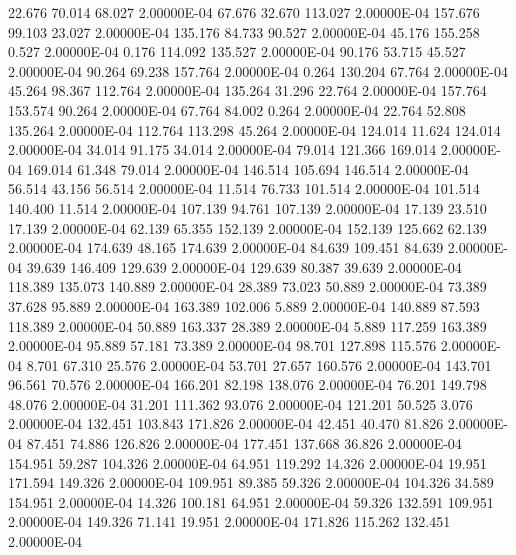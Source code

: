     22.676    70.014    68.027  2.00000E-04
    67.676    32.670   113.027  2.00000E-04
   157.676    99.103    23.027  2.00000E-04
   135.176    84.733    90.527  2.00000E-04
    45.176   155.258     0.527  2.00000E-04
     0.176   114.092   135.527  2.00000E-04
    90.176    53.715    45.527  2.00000E-04
    90.264    69.238   157.764  2.00000E-04
     0.264   130.204    67.764  2.00000E-04
    45.264    98.367   112.764  2.00000E-04
   135.264    31.296    22.764  2.00000E-04
   157.764   153.574    90.264  2.00000E-04
    67.764    84.002     0.264  2.00000E-04
    22.764    52.808   135.264  2.00000E-04
   112.764   113.298    45.264  2.00000E-04
   124.014    11.624   124.014  2.00000E-04
    34.014    91.175    34.014  2.00000E-04
    79.014   121.366   169.014  2.00000E-04
   169.014    61.348    79.014  2.00000E-04
   146.514   105.694   146.514  2.00000E-04
    56.514    43.156    56.514  2.00000E-04
    11.514    76.733   101.514  2.00000E-04
   101.514   140.400    11.514  2.00000E-04
   107.139    94.761   107.139  2.00000E-04
    17.139    23.510    17.139  2.00000E-04
    62.139    65.355   152.139  2.00000E-04
   152.139   125.662    62.139  2.00000E-04
   174.639    48.165   174.639  2.00000E-04
    84.639   109.451    84.639  2.00000E-04
    39.639   146.409   129.639  2.00000E-04
   129.639    80.387    39.639  2.00000E-04
   118.389   135.073   140.889  2.00000E-04
    28.389    73.023    50.889  2.00000E-04
    73.389    37.628    95.889  2.00000E-04
   163.389   102.006     5.889  2.00000E-04
   140.889    87.593   118.389  2.00000E-04
    50.889   163.337    28.389  2.00000E-04
     5.889   117.259   163.389  2.00000E-04
    95.889    57.181    73.389  2.00000E-04
    98.701   127.898   115.576  2.00000E-04
     8.701    67.310    25.576  2.00000E-04
    53.701    27.657   160.576  2.00000E-04
   143.701    96.561    70.576  2.00000E-04
   166.201    82.198   138.076  2.00000E-04
    76.201   149.798    48.076  2.00000E-04
    31.201   111.362    93.076  2.00000E-04
   121.201    50.525     3.076  2.00000E-04
   132.451   103.843   171.826  2.00000E-04
    42.451    40.470    81.826  2.00000E-04
    87.451    74.886   126.826  2.00000E-04
   177.451   137.668    36.826  2.00000E-04
   154.951    59.287   104.326  2.00000E-04
    64.951   119.292    14.326  2.00000E-04
    19.951   171.594   149.326  2.00000E-04
   109.951    89.385    59.326  2.00000E-04
   104.326    34.589   154.951  2.00000E-04
    14.326   100.181    64.951  2.00000E-04
    59.326   132.591   109.951  2.00000E-04
   149.326    71.141    19.951  2.00000E-04
   171.826   115.262   132.451  2.00000E-04
